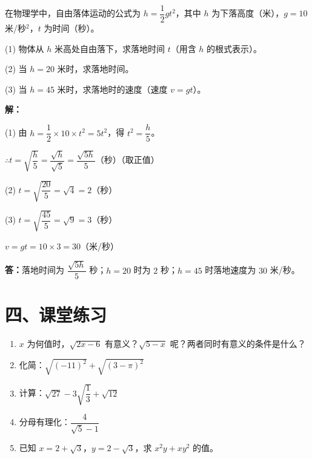 \documentclass[12pt, a4paper]{ctexart}
\begin{document}
\begin{appbox}[【应用3】物理情境中的二次根式]
在物理学中，自由落体运动的公式为 $h = \dfrac{1}{2}gt^2$，其中 $h$ 为下落高度（米），$g = 10$ 米/秒$^2$，$t$ 为时间（秒）。

(1) 物体从 $h$ 米高处自由落下，求落地时间 $t$（用含 $h$ 的根式表示）。

(2) 当 $h = 20$ 米时，求落地时间。

(3) 当 $h = 45$ 米时，求落地时的速度（速度 $v = gt$）。

\bigskip
\textbf{解：}

(1) 由 $h = \dfrac{1}{2} \times 10 \times t^2 = 5t^2$，得 $t^2 = \dfrac{h}{5}$。

$\therefore t = \sqrt{\dfrac{h}{5}} = \dfrac{\sqrt{h}}{\sqrt{5}} = \dfrac{\sqrt{5h}}{5}$（秒）\quad（取正值）

(2) $t = \sqrt{\dfrac{20}{5}} = \sqrt{4} = 2$（秒）

(3) $t = \sqrt{\dfrac{45}{5}} = \sqrt{9} = 3$（秒）

$v = gt = 10 \times 3 = 30$（米/秒）

\textbf{答：}落地时间为 $\dfrac{\sqrt{5h}}{5}$ 秒；$h=20$ 时为 $2$ 秒；$h=45$ 时落地速度为 $30$ 米/秒。
\end{appbox}

\section*{\textcolor{tipgreen}{四、课堂练习}}

\begin{enumerate}[leftmargin=2em]
  \item $x$ 为何值时，$\sqrt{2x - 6}$ 有意义？$\sqrt{5 - x}$ 呢？两者同时有意义的条件是什么？

  \item 化简：$\sqrt{(-11)^2} + \sqrt{(3 - \pi)^2}$

  \item 计算：$\sqrt{27} - 3\sqrt{\dfrac{1}{3}} + \sqrt{12}$

  \item 分母有理化：$\dfrac{4}{\sqrt{5} - 1}$

  \item 已知 $x = 2 + \sqrt{3}$，$y = 2 - \sqrt{3}$，求 $x^2 y + xy^2$ 的值。
\end{enumerate}
\end{document}
